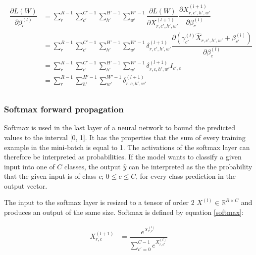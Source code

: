 \documentclass[a4paper,11pt,twoside]{article}
\newcommand*{\pd}[2]{\ensuremath{\dfrac{\partial #1}{\partial #2}}}
\begin{document}
\begin{align}
\begin{split}
	\pd{L(W)}{\beta^{(l)}_{c}}
		& = \sum^{R-1}_{r} \sum^{C'-1}_{c'} \sum^{H'-1}_{h'} \sum^{W'-1}_{w'} \pd{L(W)}{X^{(l+1)}_{r,c',h',w'}} \pd{X^{(l+1)}_{r,c',h',w'}}{\beta^{(l)}_{c}} \\
		& = \sum^{R-1}_{r} \sum^{C'-1}_{c'} \sum^{H'-1}_{h'} \sum^{W'-1}_{w'} \delta^{(l+1)}_{r,c',h',w'}  \pd{({\gamma_{c'}^{(l)} \hat{X}_{r,c',h',w'} + \beta_{c'}^{(l)}})}{\beta^{(l)}_{c}} \\
		& = \sum^{R-1}_{r} \sum^{C'-1}_{c'} \sum^{H'-1}_{h'} \sum^{W'-1}_{w'} \delta^{(l+1)}_{r,c,h',w'} I_{c',c}\\
		& = \sum^{R-1}_{r} \sum^{H'-1}_{h'} \sum^{W'-1}_{w'} \delta^{(l+1)}_{r,c,h',w'} \\
\end{split}
\end{align}

\subsubsection{Softmax forward propagation}
Softmax is used in the last layer of a neural network to bound the predicted values to the interval [0, 1]. It has the properties that the sum of every training example in the mini-batch is equal to 1. The activations of the softmax layer can therefore be interpreted as probabilities. If the model wants to classify a given input into one of $C$ classes, the output $\hat{y}$ can be interpreted as the the probability that the given input is of class $c$; $0 \leq c \leq C$, for every class prediction in the output vector. \cite{cs231n}

The input to the softmax layer is resized to a tensor of order 2 $X^{(l)} \in \mathbb{R}^{R \times C}$ and produces an output of the same size. Softmax is defined by equation \eqref{softmax}:

\begin{equation}\label{softmax}
\begin{split}
X^{(l+1)}_{r,c}
	& = \dfrac{e^{X^{(l)}_{r,c}}}{\sum^{C-1}_{c'=0}e^{X^{(l)}_{r,c'}}} \\
\end{split}
\end{equation}
\end{document}
